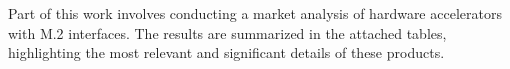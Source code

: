 


Part of this work involves conducting a market analysis of hardware accelerators with M.2 interfaces. 
The results are summarized in the attached tables, highlighting the most relevant and significant details of these products.

